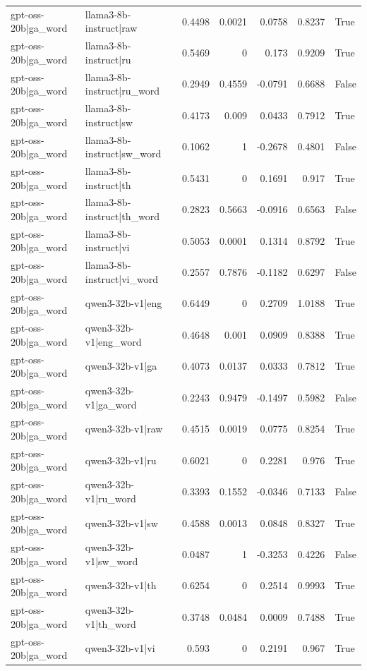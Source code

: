 \begin{table}
\begin{tabular}{l l r r r r l}
gpt-oss-20b|ga_word & llama3-8b-instruct|raw & 0.4498 & 0.0021 & 0.0758 & 0.8237 & True \\
gpt-oss-20b|ga_word & llama3-8b-instruct|ru & 0.5469 & 0 & 0.173 & 0.9209 & True \\
gpt-oss-20b|ga_word & llama3-8b-instruct|ru_word & 0.2949 & 0.4559 & -0.0791 & 0.6688 & False \\
gpt-oss-20b|ga_word & llama3-8b-instruct|sw & 0.4173 & 0.009 & 0.0433 & 0.7912 & True \\
gpt-oss-20b|ga_word & llama3-8b-instruct|sw_word & 0.1062 & 1 & -0.2678 & 0.4801 & False \\
gpt-oss-20b|ga_word & llama3-8b-instruct|th & 0.5431 & 0 & 0.1691 & 0.917 & True \\
gpt-oss-20b|ga_word & llama3-8b-instruct|th_word & 0.2823 & 0.5663 & -0.0916 & 0.6563 & False \\
gpt-oss-20b|ga_word & llama3-8b-instruct|vi & 0.5053 & 0.0001 & 0.1314 & 0.8792 & True \\
gpt-oss-20b|ga_word & llama3-8b-instruct|vi_word & 0.2557 & 0.7876 & -0.1182 & 0.6297 & False \\
gpt-oss-20b|ga_word & qwen3-32b-v1|eng & 0.6449 & 0 & 0.2709 & 1.0188 & True \\
gpt-oss-20b|ga_word & qwen3-32b-v1|eng_word & 0.4648 & 0.001 & 0.0909 & 0.8388 & True \\
gpt-oss-20b|ga_word & qwen3-32b-v1|ga & 0.4073 & 0.0137 & 0.0333 & 0.7812 & True \\
gpt-oss-20b|ga_word & qwen3-32b-v1|ga_word & 0.2243 & 0.9479 & -0.1497 & 0.5982 & False \\
gpt-oss-20b|ga_word & qwen3-32b-v1|raw & 0.4515 & 0.0019 & 0.0775 & 0.8254 & True \\
gpt-oss-20b|ga_word & qwen3-32b-v1|ru & 0.6021 & 0 & 0.2281 & 0.976 & True \\
gpt-oss-20b|ga_word & qwen3-32b-v1|ru_word & 0.3393 & 0.1552 & -0.0346 & 0.7133 & False \\
gpt-oss-20b|ga_word & qwen3-32b-v1|sw & 0.4588 & 0.0013 & 0.0848 & 0.8327 & True \\
gpt-oss-20b|ga_word & qwen3-32b-v1|sw_word & 0.0487 & 1 & -0.3253 & 0.4226 & False \\
gpt-oss-20b|ga_word & qwen3-32b-v1|th & 0.6254 & 0 & 0.2514 & 0.9993 & True \\
gpt-oss-20b|ga_word & qwen3-32b-v1|th_word & 0.3748 & 0.0484 & 0.0009 & 0.7488 & True \\
gpt-oss-20b|ga_word & qwen3-32b-v1|vi & 0.593 & 0 & 0.2191 & 0.967 & True \\

\end{tabular}
\end{table}
